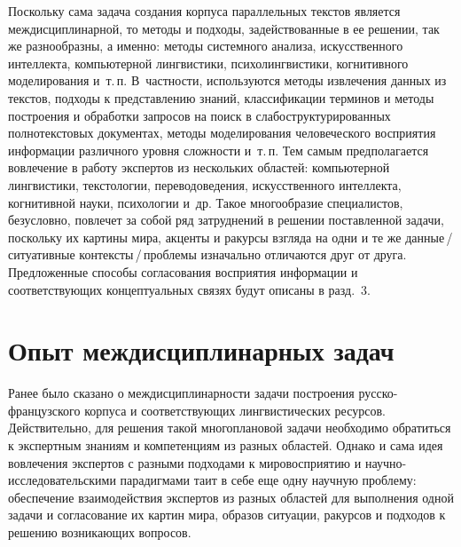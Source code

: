 \begin{multicols}{2}
     Поскольку сама задача создания корпуса параллельных текстов 
является междисциплинарной, то методы и подходы, задействованные в ее 
решении, так же разнообразны, а именно: методы системного анализа, 
искусственного интеллекта, компьютерной лингвистики, психолингвистики, 
когнитивного моделирования и~т.\,п. В~частности, используются методы 
извлечения данных из текстов, подходы к представлению знаний, 
классификации терминов и методы построения и обработки запросов на 
поиск в слабоструктурированных полнотекстовых документах, методы 
моделирования человеческого восприятия информации различного уровня 
сложности и~т.\,п. Тем самым предполагается вовлечение в работу экспертов 
из нескольких областей: компьютерной лингвистики, текстологии, 
переводоведения, искусственного интеллекта, когнитивной науки, 
психологии и~др. Такое многообразие специалистов, безусловно, 
повлечет за собой ряд затруднений в решении поставленной задачи, 
поскольку их картины мира, акценты и ракурсы взгляда на одни и те же 
     дан\-ные\,/\,си\-ту\-а\-тив\-ные кон\-текс\-ты\,/\,проб\-ле\-мы изначально 
отличаются друг от друга. Предложенные способы согласования 
восприятия информации и соответствующих концептуальных связях будут 
описаны в разд.~3.

\vspace*{-6pt}

\section{Опыт междисциплинарных задач}

\vspace*{-2pt}

     Ранее было сказано о междисциплинарности задачи построения 
     рус\-ско-фран\-цуз\-ско\-го корпуса и соответствующих 
лингвистических ресурсов. Действительно, для решения такой 
многоплановой задачи необходимо обратиться к экспертным знаниям и 
компетенциям из разных областей. Однако и сама идея вовлечения экспертов 
с разными подходами к мировосприятию и 
     на\-уч\-но-ис\-сле\-до\-ва\-тель\-ски\-ми парадигмами таит в себе еще 
одну научную проблему: обеспечение взаимодействия экспертов из разных 
областей для выполнения одной задачи и согласование их картин мира, 
образов ситуации, ракурсов и подходов к решению возникающих вопросов. 


\end{multicols}
